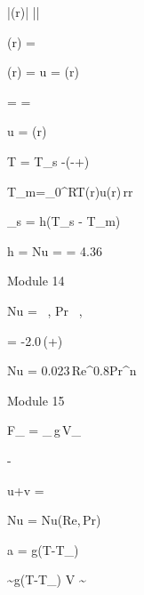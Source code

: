 \documentclass[24pt]{article}
\begin{document}
\left|\left(r\right)\right| \gg \left|\right|

\left(r\right) = 

\left(r\right) = 
\qquad \Rightarrow \qquad u =
\left(r\right)

 = 
= 

u =
\left(r\right)

T = T_s
-\left(-+\right)

T_m=\int_0^R\!\!T(r)u(r)\,rr

_s = h(T_s - T_m)

h =  \qquad \Rightarrow \qquad \mbox{Nu}
\equiv {} =  = 4.36


Module 14

\mbox{Nu} =
\,
,  \leq \mbox{Pr} \, ,

 =
-2.0\,\left(+\right)

\mbox{Nu} = 0.023\,\mbox{Re}^{0.8}\mbox{Pr}^n


Module 15

F_ = \rho_\,g\,V_

\frac{\Delta \rho}{\rho} \simeq -\beta{}

u+v =
\alpha{}

\mbox{Nu} = \mbox{Nu}(\mbox{Re},\,\mbox{Pr})

a = g\beta(T-T_\infty)

\therefore {} \sim g\beta(T-T_\infty) \qquad \Rightarrow
\qquad V \sim {}
\end{document}
